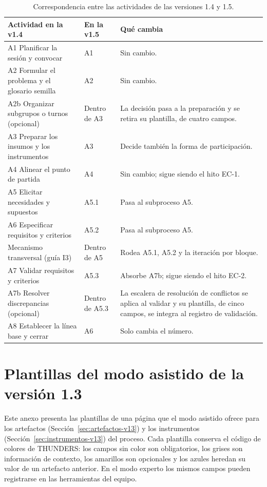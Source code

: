 \documentclass[12pt,letterpaper,oneside]{report}
\begin{document}
\begin{table}[H]
\caption{Correspondencia entre las actividades de las versiones 1.4 y 1.5.}
\label{tab:v14_v15}
\centering
\footnotesize
\renewcommand{\arraystretch}{1.12}
\begin{tabularx}{\textwidth}{@{}L{4.6cm}L{2.0cm}Y@{}}
\toprule
\textbf{Actividad en la v1.4} & \textbf{En la v1.5} & \textbf{Qué cambia} \\
\midrule
A1 Planificar la sesión y convocar & A1 & Sin cambio. \\
A2 Formular el problema y el glosario semilla & A2 & Sin cambio. \\
A2b Organizar subgrupos o turnos (opcional) & Dentro de A3 & La decisión pasa
a la preparación y se retira su plantilla, de cuatro campos. \\
A3 Preparar los insumos y los instrumentos & A3 & Decide también la forma de
participación. \\
A4 Alinear el punto de partida & A4 & Sin cambio; sigue siendo el hito EC-1. \\
A5 Elicitar necesidades y supuestos & A5.1 & Pasa al subproceso A5. \\
A6 Especificar requisitos y criterios & A5.2 & Pasa al subproceso A5. \\
Mecanismo transversal (guía I3) & Dentro de A5 & Rodea A5.1, A5.2 y la
iteración por bloque. \\
A7 Validar requisitos y criterios & A5.3 & Absorbe A7b; sigue siendo el hito
EC-2. \\
A7b Resolver discrepancias (opcional) & Dentro de A5.3 & La escalera de resolución de conflictos se aplica
al validar y su plantilla, de cinco campos, se integra al registro de
validación. \\
A8 Establecer la línea base y cerrar & A6 & Solo cambia el número. \\
\bottomrule
\end{tabularx}
\end{table}

\chapter{Plantillas del modo asistido de la versión 1.3}
\label{anx:plantillas_v13}
Este anexo presenta las plantillas de una página que el modo asistido ofrece para
los artefactos (Sección~\ref{sec:artefactos-v13}) y los instrumentos
(Sección~\ref{sec:instrumentos-v13}) del proceso. Cada plantilla conserva el código
de colores de THUNDERS: los campos sin color son obligatorios,
\colorbox{ctxFill}{los grises son información de contexto},
\colorbox{opcFill}{los amarillos son opcionales} y
\colorbox{herFill}{los azules heredan su valor de un artefacto anterior}. En el
modo experto los mismos campos pueden registrarse en las herramientas del
equipo.
\end{document}

